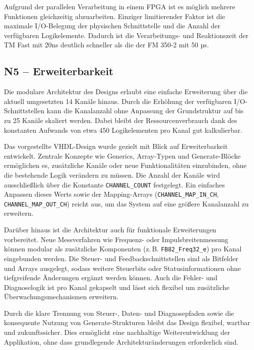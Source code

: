Aufgrund der parallelen Verarbeitung in einem FPGA ist es möglich mehrere Funktionen gleichzeitig abzuarbeiten. Einziger limitierender Faktor ist die maximale
I/O-Belegung der physischen Schnittstelle und die Anzahl der verfügbaren Logikelemente. Dadurch ist die Verarbeitungs- und Reaktionszeit der TM Fast mit 20ns deutlich schneller als die der FM 350-2 mit 50 µs.

\subsection*{N5 – Erweiterbarkeit}

Die modulare Architektur des Designs erlaubt eine einfache Erweiterung über die aktuell umgesetzten 14 Kanäle hinaus. Durch die Erhöhung der verfügbaren I/O-Schnittstellen kann die Kanalanzahl ohne Anpassung der Grundstruktur auf bis zu 25 Kanäle skaliert werden. Dabei bleibt der Ressourcenverbrauch dank des konstanten Aufwands von etwa 450 Logikelementen pro Kanal gut kalkulierbar.  

Das vorgestellte VHDL-Design wurde gezielt mit Blick auf Erweiterbarkeit entwickelt. Zentrale Konzepte wie Generics, Array-Typen und Generate-Blöcke ermöglichen es, zusätzliche Kanäle oder neue Funktionalitäten einzubinden, ohne die bestehende Logik verändern zu müssen. Die Anzahl der Kanäle wird ausschließlich über die Konstante \texttt{CHANNEL\_COUNT} festgelegt. Ein einfaches Anpassen dieses Werts sowie der Mapping-Arrays (\texttt{CHANNEL\_MAP\_IN\_CH}, \texttt{CHANNEL\_MAP\_OUT\_CH}) reicht aus, um das System auf eine größere Kanalanzahl zu erweitern.  

Darüber hinaus ist die Architektur auch für funktionale Erweiterungen vorbereitet. Neue Messverfahren wie Frequenz- oder Impulsbreitenmessung können modular als zusätzliche Komponenten (z.\,B. \texttt{FB82\_Freq32\_e}) pro Kanal eingebunden werden. Die Steuer- und Feedbackschnittstellen sind als Bitfelder und Arrays ausgelegt, sodass weitere Steuerbits oder Statusinformationen ohne tiefgreifende Änderungen ergänzt werden können. Auch die Fehler- und Diagnoselogik ist pro Kanal gekapselt und lässt sich flexibel um zusätzliche Überwachungsmechanismen erweitern.  

Durch die klare Trennung von Steuer-, Daten- und Diagnosepfaden sowie die konsequente Nutzung von Generate-Strukturen bleibt das Design flexibel, wartbar und zukunftssicher. Dies ermöglicht eine nachhaltige Weiterentwicklung der Applikation, ohne dass grundlegende Architekturänderungen erforderlich sind.  

